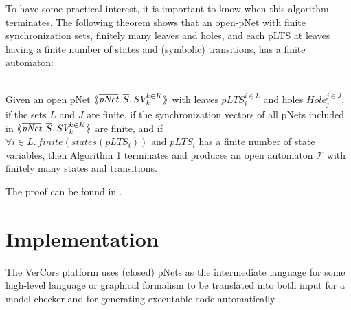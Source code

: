 \documentclass{lncs/llncs}
\begin{document}
To have some practical interest, it is important to know when this
algorithm terminates. The following theorem shows that an open-pNet
with finite synchronization sets, finitely many leaves and
holes, and each pLTS at leaves having a finite number of states and
(symbolic) transitions, has a finite automaton:

\begin{theorem}\\
Given an open pNet $\mylangle \overline{\pNet},\overline{S}, \symb{SV}_k^{k\in K}\myrangle$ with leaves $pLTS_i^{i\in L}$ and holes $Hole_j^{j\in
  J}$, if the sets $L$ and $J$ are finite, if the synchronization vectors of all pNets 
  included in  $\mylangle \overline{\pNet},\overline{S}, \symb{SV}_k^{k\in K}\myrangle$ 
  are finite, and if
$\forall i \in L.\, finite{(states(pLTS_i))} \text{ and } pLTS_i$
has a finite number of state variables, then Algorithm 1 terminates
and produces an open automaton 
$\mathcal{T}$ with finitely many states and transitions.

The proof can be found in \cite{henrio:Forte2016}.



\end{theorem}

\section{Implementation}
\label{section:implementation}
The VerCors platform uses (closed) pNets as the intermediate language
for some high-level language or graphical formalism to be translated
into both input for a 
model-checker and for generating executable code automatically \cite{HKM-FASE16}.
\end{document}
